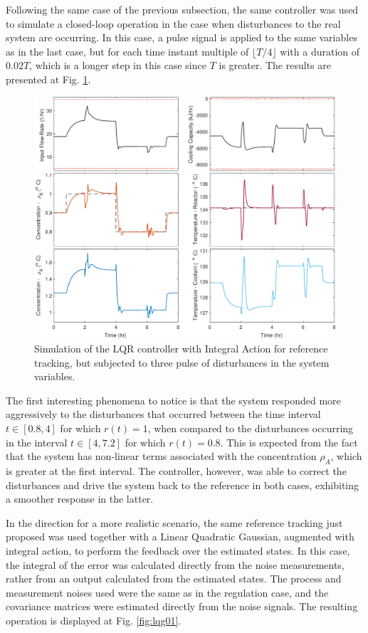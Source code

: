 \documentclass[a4paper,11pt]{book}
\numberwithin{figure}{chapter}
\numberwithin{equation}{chapter}
\numberwithin{table}{chapter}
\theoremstyle{definition}
\begin{document}
Following the same case of the previous subsection, the same controller was used to simulate a closed-loop operation in the case when disturbances to the real system are occurring. In this case, a pulse signal is applied to the same variables as in the last case, but for each time instant multiple of $\lfloor T/4 \rfloor$ with a duration of $0.02T$, which is a longer step in this case since $T$ is greater. The results are presented at Fig. \ref{fig:lqri02}. 

\begin{figure}[ht] \centering
	\includegraphics[width=\textwidth]{chapter7/lqri02}
	
	\caption{Simulation of the LQR controller with Integral Action for reference tracking, but subjected to three pulse of disturbances in the system variables.}
	\label{fig:lqri02}
\end{figure}	

The first interesting phenomena to notice is that the system responded more aggressively to the disturbances that occurred between the time interval $t \in [0.8, 4]$ for which $r(t) = 1$, when compared to the disturbances occurring in the interval $t \in [4, 7.2]$ for which $r(t) = 0.8$. This is expected from the fact that the system has non-linear terms associated with the concentration $\rho_A$, which is greater at the first interval. The controller, however, was able to correct the disturbances and drive the system back to the reference in both cases, exhibiting a smoother response in the latter.

In the direction for a more realistic scenario, the same reference tracking just proposed was used together with a Linear Quadratic Gaussian, augmented with integral action, to perform the feedback over the estimated states. In this case, the integral of the error was calculated directly from the noise measurements, rather from an output calculated from the estimated states. The process and measurement noises used were the same as in the regulation case, and the covariance matrices were estimated directly from the noise signals. The resulting operation is displayed at Fig. \ref{fig:lqg01}.
\end{document}
